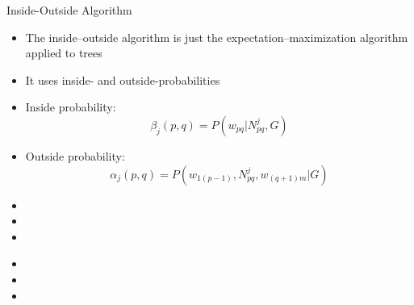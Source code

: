 \documentclass[xcolor=pdftex,x11names,table,hyperref]{beamer}
\begin{document}
\begin{frame}{Inside-Outside Algorithm}
\begin{itemize}
	\item The inside--outside algorithm is just the expectation--maximization algorithm applied to trees
	\item It uses inside- and outside-probabilities
	\item Inside probability:
	\begin{equation}
	\beta_j(p,q) = P(w_{pq}|N^j_{pq}, G)
	\end{equation}
	\item Outside probability:
	\begin{equation}
	\alpha_j(p,q) = P(w_{1(p-1)}, N^j_{pq}, w_{(q+1)m}|G)
	\end{equation}
\end{itemize}
\end{frame}




\begin{frame}{}
\begin{itemize}
	\item 
	\item 
	\item 
\end{itemize}
\end{frame}



\begin{frame}{}
\begin{itemize}
	\item 
	\item 
	\item 
\end{itemize}
\end{frame}




\end{document}
